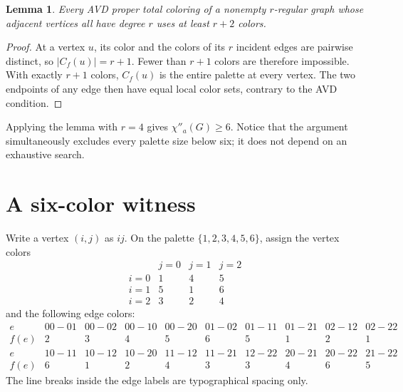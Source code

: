 \documentclass[11pt]{article}
\newtheorem{lemma}{Lemma}
\begin{document}
\begin{lemma}
Every AVD proper total coloring of a nonempty $r$-regular graph whose adjacent
vertices all have degree $r$ uses at least $r+2$ colors.
\end{lemma}

\begin{proof}
At a vertex $u$, its color and the colors of its $r$ incident edges are
pairwise distinct, so $|C_f(u)|=r+1$.  Fewer than $r+1$ colors are therefore
impossible.  With exactly $r+1$ colors, $C_f(u)$ is the entire palette at every
vertex.  The two endpoints of any edge then have equal local color sets,
contrary to the AVD condition.
\end{proof}

Applying the lemma with $r=4$ gives $\chi''_a(G)\geq 6$.  Notice that the
argument simultaneously excludes every palette size below six; it does not
depend on an exhaustive search.

\section{A six-color witness}

Write a vertex $(i,j)$ as $ij$.  On the palette $\{1,2,3,4,5,6\}$, assign the
vertex colors
\[
\begin{array}{c|ccc}
 &j=0&j=1&j=2\\ \hline
i=0&1&4&5\\
i=1&5&1&6\\
i=2&3&2&4
\end{array}
\]
and the following edge colors:
\[
\begin{array}{c|ccccccccc}
e&00\!-
01&00\!-
02&00\!-
10&00\!-
20&01\!-
02&01\!-
11&01\!-
21&02\!-
12&02\!-
22\\ \hline
f(e)&2&3&4&5&6&5&1&2&1
\end{array}
\]
\[
\begin{array}{c|ccccccccc}
e&10\!-
11&10\!-
12&10\!-
20&11\!-
12&11\!-
21&12\!-
22&20\!-
21&20\!-
22&21\!-
22\\ \hline
f(e)&6&1&2&4&3&3&4&6&5
\end{array}
\]
The line breaks inside the edge labels are typographical spacing only.
\end{document}
